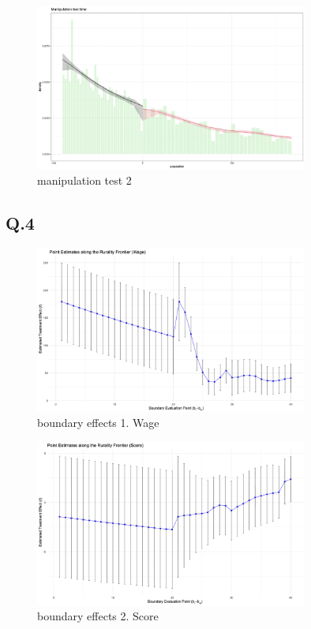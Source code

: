 \documentclass{article}
\begin{document}
\begin{figure}[H]
    \centering
    \includegraphics[width=0.8\textwidth]{figures/manipul_time.png}
    \caption{manipulation test 2}
    \label{fig:manipul2}
\end{figure}


\subsection*{Q.4}

\begin{figure}[H]
    \centering
    \includegraphics[width=0.8\textwidth]{figures/q4_1.png}
    \caption{boundary effects 1. Wage}
    \label{fig:boundary1}
\end{figure}

\begin{figure}[H]
    \centering
    \includegraphics[width=0.8\textwidth]{figures/q4_2.png}
    \caption{boundary effects 2. Score}
    \label{fig:boundary2}
\end{figure}
\end{document}
